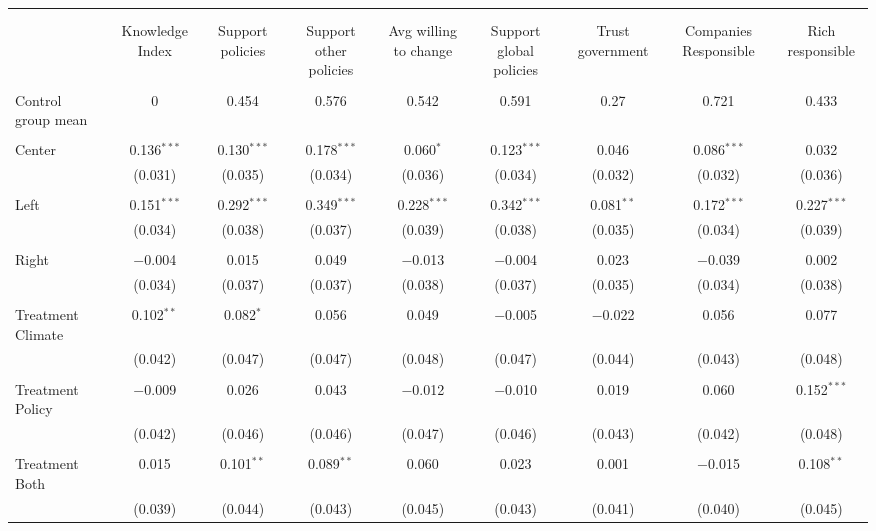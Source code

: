 
\begin{tabular}{@{\extracolsep{5pt}}lcccccccc} 
\\[-1.8ex]\hline 
\hline \\[-1.8ex] 
\\[-1.8ex] & Knowledge Index & Support policies & Support other policies & Avg willing to change & Support global policies & Trust government & Companies Responsible & Rich responsible \\ 
\hline \\[-1.8ex] 
 Control group mean & 0 & 0.454 & 0.576 & 0.542 & 0.591 & 0.27 & 0.721 & 0.433  \\ \hline \\[-1.8ex] Center & 0.136$^{***}$ & 0.130$^{***}$ & 0.178$^{***}$ & 0.060$^{*}$ & 0.123$^{***}$ & 0.046 & 0.086$^{***}$ & 0.032 \\ 
  & (0.031) & (0.035) & (0.034) & (0.036) & (0.034) & (0.032) & (0.032) & (0.036) \\ 
  & & & & & & & & \\ 
 Left & 0.151$^{***}$ & 0.292$^{***}$ & 0.349$^{***}$ & 0.228$^{***}$ & 0.342$^{***}$ & 0.081$^{**}$ & 0.172$^{***}$ & 0.227$^{***}$ \\ 
  & (0.034) & (0.038) & (0.037) & (0.039) & (0.038) & (0.035) & (0.034) & (0.039) \\ 
  & & & & & & & & \\ 
 Right & $-$0.004 & 0.015 & 0.049 & $-$0.013 & $-$0.004 & 0.023 & $-$0.039 & 0.002 \\ 
  & (0.034) & (0.037) & (0.037) & (0.038) & (0.037) & (0.035) & (0.034) & (0.038) \\ 
  & & & & & & & & \\ 
 Treatment Climate & 0.102$^{**}$ & 0.082$^{*}$ & 0.056 & 0.049 & $-$0.005 & $-$0.022 & 0.056 & 0.077 \\ 
  & (0.042) & (0.047) & (0.047) & (0.048) & (0.047) & (0.044) & (0.043) & (0.048) \\ 
  & & & & & & & & \\ 
 Treatment Policy & $-$0.009 & 0.026 & 0.043 & $-$0.012 & $-$0.010 & 0.019 & 0.060 & 0.152$^{***}$ \\ 
  & (0.042) & (0.046) & (0.046) & (0.047) & (0.046) & (0.043) & (0.042) & (0.048) \\ 
  & & & & & & & & \\ 
 Treatment Both & 0.015 & 0.101$^{**}$ & 0.089$^{**}$ & 0.060 & 0.023 & 0.001 & $-$0.015 & 0.108$^{**}$ \\ 
  & (0.039) & (0.044) & (0.043) & (0.045) & (0.043) & (0.041) & (0.040) & (0.045) \\ 

\end{tabular}

